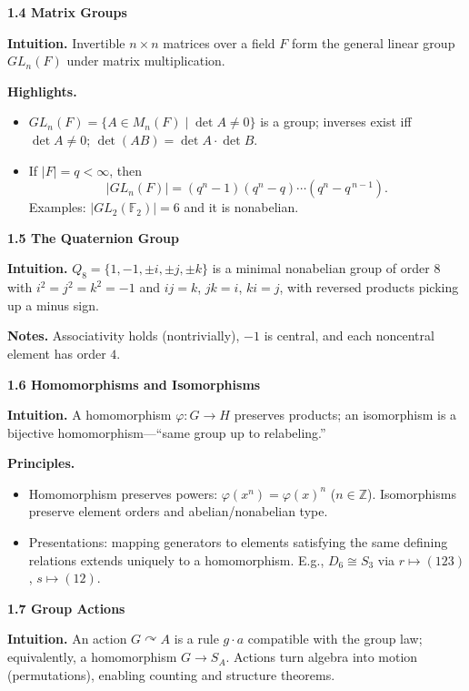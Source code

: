 \documentclass[12pt]{article}
\theoremstyle{definition}
\begin{document}
\newpage

\textbf{1.4 Matrix Groups}

\newpage

\textbf{Intuition.} Invertible $n\times n$ matrices over a field $F$ form the general linear group $GL_n(F)$ under matrix multiplication.

\textbf{Highlights.}
\begin{itemize}\itemsep3pt
\item $GL_n(F)=\{A\in M_n(F)\mid \det A\ne 0\}$ is a group; inverses exist iff $\det A\ne0$; $\det(AB)=\det A\cdot\det B$.
\item If $|F|=q<\infty$, then 
\[
|GL_n(F)|=(q^n-1)(q^n-q)\cdots(q^n-q^{\,n-1}).
\]
Examples: $|GL_2(\mathbb{F}_2)|=6$ and it is nonabelian.
\end{itemize}

\newpage

\textbf{1.5 The Quaternion Group}

\newpage

\textbf{Intuition.} $Q_8=\{1,-1,\pm i,\pm j,\pm k\}$ is a minimal nonabelian group of order $8$ with $i^2=j^2=k^2=-1$ and $ij=k$, $jk=i$, $ki=j$, with reversed products picking up a minus sign.

\textbf{Notes.} Associativity holds (nontrivially), $-1$ is central, and each noncentral element has order $4$.

\newpage

\textbf{1.6 Homomorphisms and Isomorphisms}

\newpage

\textbf{Intuition.} A homomorphism $\varphi:G\to H$ preserves products; an isomorphism is a bijective homomorphism—“same group up to relabeling.”

\textbf{Principles.}
\begin{itemize}\itemsep3pt
\item Homomorphism preserves powers: $\varphi(x^n)=\varphi(x)^n$ ($n\in\mathbb{Z}$). Isomorphisms preserve element orders and abelian/nonabelian type.
\item Presentations: mapping generators to elements satisfying the same defining relations extends uniquely to a homomorphism. E.g., $D_6\cong S_3$ via $r\mapsto(123)$, $s\mapsto(12)$.
\end{itemize}

\newpage

\textbf{1.7 Group Actions}

\newpage

\textbf{Intuition.} An action $G\curvearrowright A$ is a rule $g\cdot a$ compatible with the group law; equivalently, a homomorphism $G\to S_A$. Actions turn algebra into motion (permutations), enabling counting and structure theorems.
\end{document}
